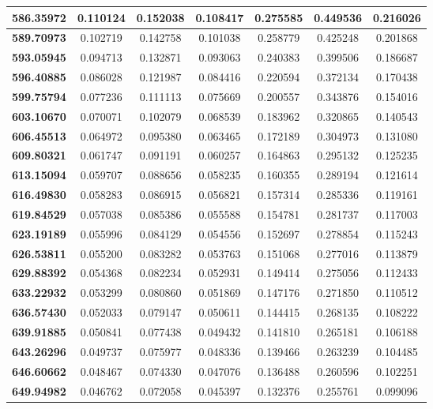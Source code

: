 \documentclass[10pt, a4paper]{article}
\begin{document}
\begin{appendices}
\begin{longtable}{|c|c|c|c|c|c|c|}
	\textbf{586.35972} & 0.110124 & 0.152038 & 0.108417 & 0.275585 & 0.449536 & 0.216026 \\ \hline
	\textbf{589.70973} & 0.102719 & 0.142758 & 0.101038 & 0.258779 & 0.425248 & 0.201868 \\ \hline
	\textbf{593.05945} & 0.094713 & 0.132871 & 0.093063 & 0.240383 & 0.399506 & 0.186687 \\ \hline
	\textbf{596.40885} & 0.086028 & 0.121987 & 0.084416 & 0.220594 & 0.372134 & 0.170438 \\ \hline
	\textbf{599.75794} & 0.077236 & 0.111113 & 0.075669 & 0.200557 & 0.343876 & 0.154016 \\ \hline
	\textbf{603.10670} & 0.070071 & 0.102079 & 0.068539 & 0.183962 & 0.320865 & 0.140543 \\ \hline
	\textbf{606.45513} & 0.064972 & 0.095380 & 0.063465 & 0.172189 & 0.304973 & 0.131080 \\ \hline
	\textbf{609.80321} & 0.061747 & 0.091191 & 0.060257 & 0.164863 & 0.295132 & 0.125235 \\ \hline
	\textbf{613.15094} & 0.059707 & 0.088656 & 0.058235 & 0.160355 & 0.289194 & 0.121614 \\ \hline
	\textbf{616.49830} & 0.058283 & 0.086915 & 0.056821 & 0.157314 & 0.285336 & 0.119161 \\ \hline
	\textbf{619.84529} & 0.057038 & 0.085386 & 0.055588 & 0.154781 & 0.281737 & 0.117003 \\ \hline
	\textbf{623.19189} & 0.055996 & 0.084129 & 0.054556 & 0.152697 & 0.278854 & 0.115243 \\ \hline
	\textbf{626.53811} & 0.055200 & 0.083282 & 0.053763 & 0.151068 & 0.277016 & 0.113879 \\ \hline
	\textbf{629.88392} & 0.054368 & 0.082234 & 0.052931 & 0.149414 & 0.275056 & 0.112433 \\ \hline
	\textbf{633.22932} & 0.053299 & 0.080860 & 0.051869 & 0.147176 & 0.271850 & 0.110512 \\ \hline
	\textbf{636.57430} & 0.052033 & 0.079147 & 0.050611 & 0.144415 & 0.268135 & 0.108222 \\ \hline
	\textbf{639.91885} & 0.050841 & 0.077438 & 0.049432 & 0.141810 & 0.265181 & 0.106188 \\ \hline
	\textbf{643.26296} & 0.049737 & 0.075977 & 0.048336 & 0.139466 & 0.263239 & 0.104485 \\ \hline
	\textbf{646.60662} & 0.048467 & 0.074330 & 0.047076 & 0.136488 & 0.260596 & 0.102251 \\ \hline
	\textbf{649.94982} & 0.046762 & 0.072058 & 0.045397 & 0.132376 & 0.255761 & 0.099096 \\ \hline

\end{longtable}
\end{appendices}
\end{document}
